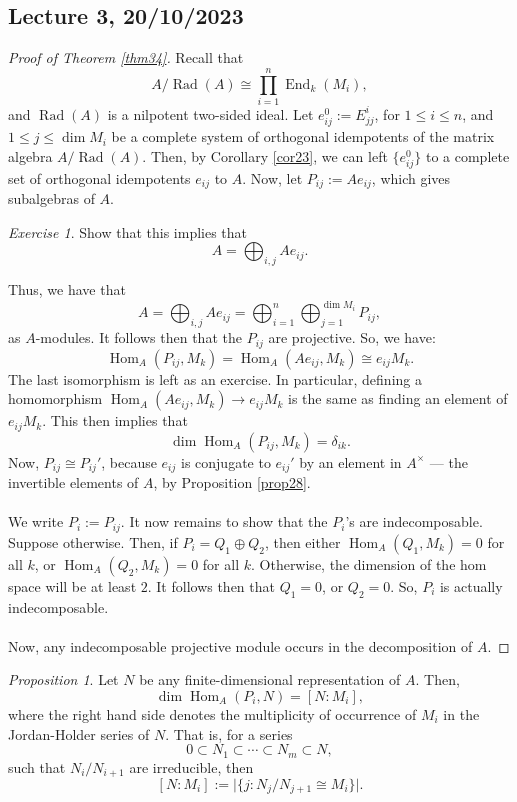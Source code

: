 \documentclass[a4paper]{report}
\theoremstyle{definition}
\theoremstyle{remark}
\theoremstyle{proposition}
\newtheorem{proposition}{Proposition}
\theoremstyle{conjecture}
\theoremstyle{lemma}
\theoremstyle{corollary}
\theoremstyle{exercise}
\newtheorem{exercise}{Exercise}
\theoremstyle{example}
\newcommand{\on}{\operatorname}
\begin{document}
\subsection{Lecture 3, 20/10/2023}

\begin{proof}[Proof of Theorem \ref{thm34}]
    Recall that 
    $$A/\on{Rad}(A) \cong \prod_{i=1}^n \on{End}_k(M_i),$$
    and $\on{Rad}(A)$ is a nilpotent two-sided ideal. Let 
    $e_{ij}^0 := E_{jj}^i$, for $1\leq i \leq n$, and $1\leq j \leq \dim M_i$
    be a complete system of orthogonal idempotents of the matrix 
    algebra $A/\on{Rad}(A)$. Then, by Corollary \ref{cor23}, we can left
    $\lbrace e_{ij}^0\rbrace$ to a complete set of orthogonal idempotents
    $e_{ij}$ to $A$. Now, let $P_{ij} := Ae_{ij}$, which gives subalgebras
    of $A$. 
    \begin{exercise}
        Show that this implies that 
        $$A = \bigoplus_{i,j} Ae_{ij}.$$
    \end{exercise}
    Thus, we have that 
    $$A = \bigoplus_{i,j} Ae_{ij} = \bigoplus_{i=1}^n \bigoplus_{j=1}^{\dim M_i}P_{ij},$$
    as $A$-modules. It follows then that the $P_{ij}$ are projective.
    So, we have:
    $$\on{Hom}_A(P_{ij},M_k) = \on{Hom}_A(Ae_{ij},M_k) \cong e_{ij}M_k.$$
    The last isomorphism is left as an exercise. In particular, defining 
    a homomorphism $\on{Hom}_A(Ae_{ij},M_k) \to e_{ij}M_k$ is the same
    as finding an element of $e_{ij}M_k$. 
    This then implies that 
    $$\dim \on{Hom}_A(P_{ij},M_k) = \delta_{ik}.$$
    Now, $P_{ij} \cong P_{ij}'$, because $e_{ij}$ is conjugate to 
    $e_{ij}'$ by an element in $A^\times$ --- the invertible elements of $A$,
    by Proposition \ref{prop28}.\\\\
    We write $P_i := P_{ij}$. It now remains to show that the $P_i$'s
    are indecomposable. Suppose otherwise. Then, if $P_i = Q_1 \oplus Q_2$,
    then either $\on{Hom}_A(Q_1,M_k) = 0$ for all $k$, or 
    $\on{Hom}_A(Q_2,M_k) = 0$ for all $k$. Otherwise, the dimension of the 
    hom space will be at least $2$. It follows then that $Q_1 = 0$, or $Q_2=0$.
    So, $P_i$ is actually indecomposable.\\\\
    Now, any indecomposable projective module occurs in the decomposition
    of $A$.
\end{proof}

\begin{proposition}
    Let $N$ be any finite-dimensional representation of $A$. Then,
    $$\dim \on{Hom}_A(P_i,N) = [N:M_i],$$
    where the right hand side denotes the multiplicity of occurrence of $M_i$ 
    in the Jordan-Holder series of $N$. That is, for a series
    $$0 \subset N_1 \subset \cdots \subset N_m\subset N,$$
    such that $N_i/N_{i+1}$ are irreducible, then 
    $$[N:M_i] := \vert \lbrace j : N_j/N_{j+1} \cong M_i\rbrace\vert.$$
\end{proposition}
\end{document}
